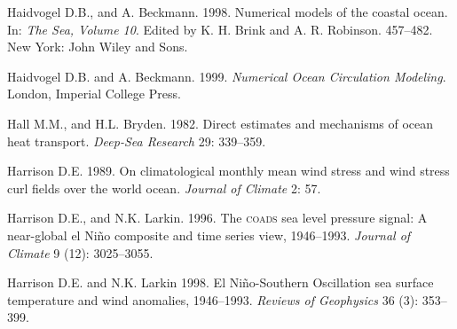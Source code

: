 \begin{thebibliography}{999}
Haidvogel D.B., and A. Beckmann.  1998. Numerical models of the
coastal ocean. In: \textit{The Sea, Volume 10}. Edited by K. H. Brink
and A. R. Robinson. 457--482. New York: John Wiley and Sons.
%

Haidvogel D.B. and A. Beckmann.  1999. \textit{Numerical Ocean
  Circulation Modeling}. London, Imperial College Press.
%

Hall M.M., and H.L. Bryden.  1982. Direct estimates and mechanisms of
ocean heat transport. \textit{Deep-Sea Research} 29: 339--359.
%

Harrison D.E.  1989. On climatological monthly mean wind stress and
wind stress curl fields over the world ocean. \textit{Journal of
  Climate} 2: 57.
%

Harrison D.E., and N.K. Larkin.  1996. The \textsc{coads} sea level
pressure signal: A near-global el Ni\~{n}o composite and time series
view, 1946--1993.  \textit{Journal of Climate} 9 (12): 3025--3055.
%

Harrison D.E. and N.K. Larkin 1998. El Ni\~{n}o-Southern Oscillation
sea surface temperature and wind anomalies,
1946--1993. \textit{Reviews of Geophysics} 36 (3): 353--399.
%


\end{thebibliography}
